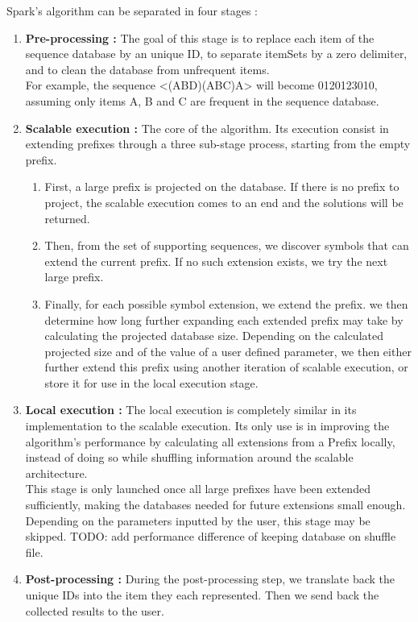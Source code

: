 \documentclass{eplmastersthesis}
\begin{document}
Spark's algorithm can be separated in four stages :

\begin{enumerate}
\item \textbf{Pre-processing :} The goal of this stage is to replace each item of the sequence database by an unique ID, to separate itemSets by a zero delimiter, and to clean the database from unfrequent items. \\
For example, the sequence <(ABD)(ABC)A> will become 0120123010, assuming only items A, B and C are frequent in the sequence database.
\item \textbf{Scalable execution :} The core of the algorithm. Its execution consist in extending prefixes through a three sub-stage process, starting from the empty prefix.
	\begin{enumerate}
	\item First, a large prefix is projected on the database. If there is no prefix to project, the scalable execution comes to an end and the solutions will be returned.
	\item Then, from the set of supporting sequences, we discover symbols that can extend the current prefix. If no such extension exists, we try the next large prefix.
	\item Finally, for each possible symbol extension, we extend the prefix. we then determine how long further expanding each extended prefix may take by calculating the projected database size. Depending on the calculated projected size and of the value of a user defined parameter, we then either further extend this prefix using another iteration of scalable execution, or store it for use in the local execution stage. 
	\end{enumerate}
\item \textbf{Local execution :} The local execution is completely similar in its implementation to the scalable execution. Its only use is in improving the algorithm's performance by calculating all extensions from a Prefix locally, instead of doing so while shuffling information around the scalable architecture. \\
This stage is only launched once all large prefixes have been extended sufficiently, making the databases needed for future extensions small enough. Depending on the parameters inputted by the user, this stage may be skipped. TODO: add performance difference of keeping database on shuffle file.
\item \textbf{Post-processing :} During the post-processing step, we translate back the unique IDs into the item they each represented. Then we send back the collected results to the user.
\end{enumerate}
\end{document}
